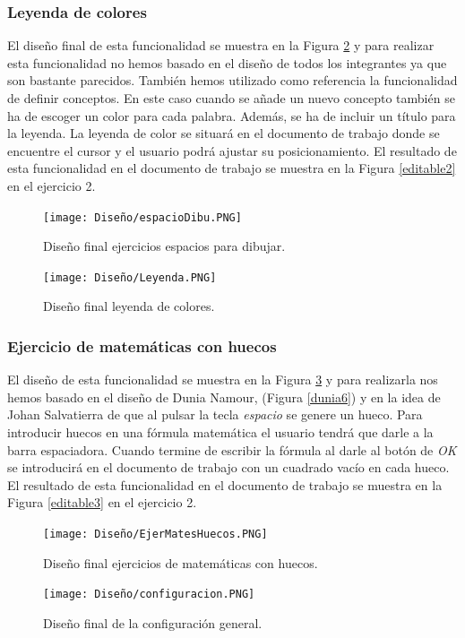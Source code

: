 \subsubsection{Leyenda de colores}
El diseño final de esta funcionalidad se muestra en la Figura \ref{LeyendaColores} y para realizar esta funcionalidad no hemos basado en el diseño de todos los integrantes ya que son bastante parecidos. También hemos utilizado como referencia la funcionalidad de definir conceptos. En este caso cuando se añade un nuevo concepto también se ha de escoger un color para cada palabra. Además, se ha de incluir un título para la leyenda. La leyenda de color se situará en el documento de trabajo donde se encuentre el cursor y el usuario podrá ajustar su posicionamiento. El resultado de esta funcionalidad en el documento de trabajo se muestra en la Figura \ref{editable2} en el ejercicio 2.

\begin{multicols}{2}
  \begin{figure}[H]
    \centering
    \texttt{[image: Diseño/espacioDibu.PNG]}
    \caption{Diseño final ejercicios espacios para dibujar.}
    \label{espaciosDibu}
  \end{figure}
  \begin{figure}[H]
    \centering
    \texttt{[image: Diseño/Leyenda.PNG]}
    \caption{Diseño final leyenda de colores.}
    \label{LeyendaColores}
  \end{figure}
\end{multicols} 

\subsubsection{Ejercicio de matemáticas con huecos}
El diseño de esta funcionalidad se muestra en la Figura \ref{matesHueco} y para realizarla nos hemos basado en el diseño de Dunia Namour, (Figura \ref{dunia6}) y en la idea de Johan Salvatierra de que al pulsar la tecla \textit{espacio} se genere un hueco. Para introducir huecos en una fórmula matemática el usuario tendrá que darle a la barra espaciadora. Cuando termine de escribir la fórmula al darle al botón de \textit{OK} se introducirá en el documento de trabajo con un cuadrado vacío en cada hueco. El resultado de esta funcionalidad en el documento de trabajo se muestra en la Figura \ref{editable3} en el ejercicio 2.

\begin{figure}[ht!]
  \centering
  \texttt{[image: Diseño/EjerMatesHuecos.PNG]}
  \caption{Diseño final ejercicios de matemáticas con huecos.}
  \label{matesHueco}
\end{figure}
\begin{figure}[ht!]
  \centering
  \texttt{[image: Diseño/configuracion.PNG]}
  \caption{Diseño final de la configuración general.}
  \label{configu}
\end{figure}

